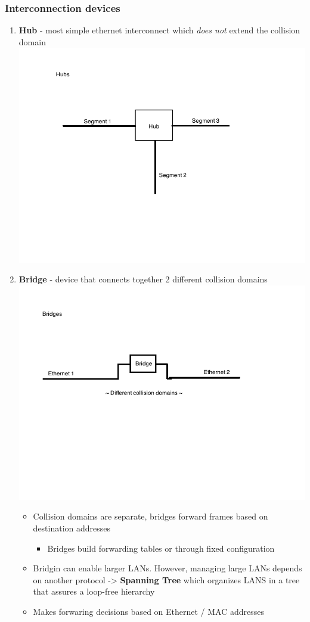\documentclass[11pt]{article}
\begin{document}
\subsubsection{Interconnection devices}
\label{sec:orgheadline43}
\begin{enumerate}
\item \textbf{Hub} - most simple ethernet interconnect which \emph{does not} extend the
collision domain
\includegraphics[width=.9\linewidth]{diagrams/fig8.png}
\item \textbf{Bridge} - device that connects together 2 different collision domains
\includegraphics[width=.9\linewidth]{diagrams/bridge.png}
\begin{itemize}
\item Collision domains are separate, bridges forward frames based on
destination addresses
\begin{itemize}
\item Bridges build forwarding tables or through fixed configuration
\end{itemize}
\item Bridgin can enable larger LANs. However, managing large LANs depends on
another protocol -> \textbf{Spanning Tree} which organizes LANS in a tree that
assures a loop-free hierarchy
\item Makes forwaring decisions based on Ethernet / MAC addresses
\end{itemize}
\end{enumerate}
\end{document}
